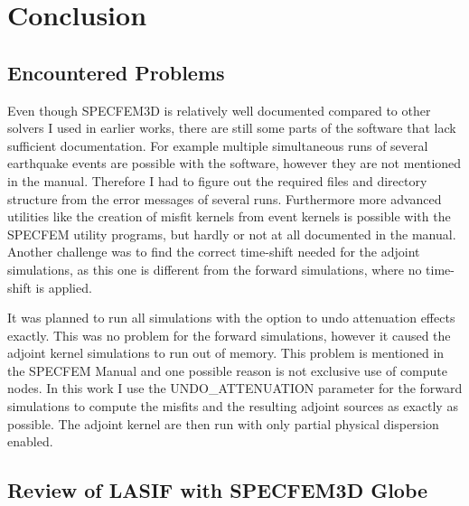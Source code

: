 

\chapter{Conclusion}


\section{Encountered Problems}

Even though SPECFEM3D is relatively well documented compared to other solvers I used in 
earlier works, there are still some parts of the software that lack sufficient documentation.
For example multiple simultaneous runs of several earthquake events are possible with the 
software, however they are not mentioned in the manual.
Therefore I had to figure out the required files and directory structure from the error messages of
several runs. 
Furthermore more advanced utilities like the creation of misfit kernels from event kernels is
possible with the SPECFEM utility programs, but hardly or not at all documented in the manual.
Another challenge was to find the correct time-shift needed for the adjoint simulations, as this 
one is different from the forward simulations, where no time-shift is applied.

It was planned to run all simulations with the option to undo attenuation effects exactly. 
This was no problem for the forward simulations, however it caused the adjoint kernel
simulations to run out of memory.
This problem is mentioned in the SPECFEM Manual and one possible reason is not exclusive use
of compute nodes. 
In this work I use the UNDO\_ATTENUATION parameter for the forward simulations to compute the 
misfits and the resulting adjoint sources as exactly as possible.
The adjoint kernel are then run with only partial physical dispersion enabled.

\section{Review of LASIF with SPECFEM3D Globe} 

